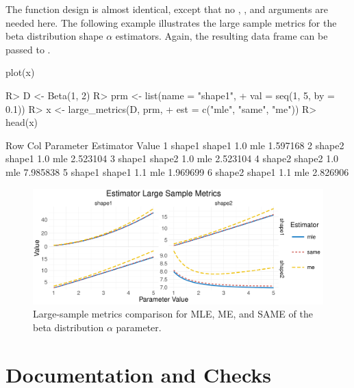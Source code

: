 \documentclass[nojss]{jss}
\newcommand{\fct}[1]{\code{#1()}}
\begin{document}
The \fct{large\_metrics} function design is almost identical, except that no , , and  arguments are needed here. The following example illustrates the large sample metrics for the beta distribution shape $\alpha$ estimators. Again, the resulting data frame can be passed to \fct{plot}.

\begin{CodeChunk}
\begin{CodeInput}
plot(x)
\end{CodeInput}
\end{CodeChunk}

\begin{Schunk}
\begin{Sinput}
R> D <- Beta(1, 2)
R> prm <- list(name = "shape1",
+              val = seq(1, 5, by = 0.1))
R> x <- large_metrics(D, prm,
+                     est = c("mle", "same", "me"))
R> head(x)
\end{Sinput}
\begin{Soutput}
     Row    Col Parameter Estimator    Value
1 shape1 shape1       1.0       mle 1.597168
2 shape2 shape1       1.0       mle 2.523104
3 shape1 shape2       1.0       mle 2.523104
4 shape2 shape2       1.0       mle 7.985838
5 shape1 shape1       1.1       mle 1.969699
6 shape2 shape1       1.1       mle 2.826906
\end{Soutput}
\end{Schunk}

\begin{figure}[t!]
\centering
\includegraphics{estim-vis_large_beta}
  \caption{\label{fig:vis-large-beta} Large-sample metrics comparison for MLE, ME, and SAME of the beta distribution $\alpha$ parameter.}
\end{figure}

\section[Documentation and Checks]{Documentation and Checks} \label{s:doc}
\end{document}

